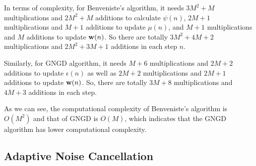 \documentclass[10pt]{article}
\begin{document}


In terms of complexity, for Benveniste's algorithm, it needs $3M^2+M$ multiplications and $2M^2+M$ additions to
calculate $\psi (n)$, $2M+1$ multiplications and $M+1$ additions to update $\mu(n)$, and $M+1$ multiplications and $M$ additions 
to update ${\bf{w}}(n)$. So there are totally $3M^2 + 4M +2$ multiplications and $2M^2 + 3M + 1$ additions in each step $n$.

Similarly, for GNGD algorithm, it needs $M+6$ multiplications and $2M+2$ additions to update $\epsilon(n)$ as well as 
$2M + 2$ multiplications and $2M + 1$ additions to update ${\bf{w}}(n)$. So, there are totally $3M+8$ multiplications and 
$4M+3$ additions in each step.

As we can see, the computational complexity of Benveniste's algorithm is $O(M^2)$ and that of GNGD is $O(M)$, which 
indicates that the GNGD algorithm has lower computational complexity.

\subsection{Adaptive Noise Cancellation}
\end{document}
